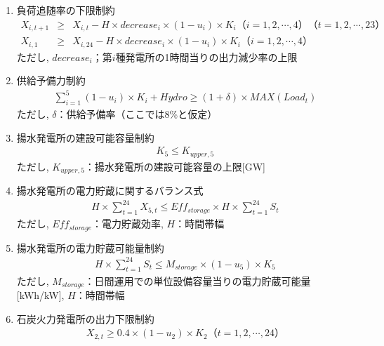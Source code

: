 \documentclass[]{jsarticle}
\begin{document}
\begin{enumerate}
            \item 負荷追随率の下限制約
              \begin{eqnarray}
                X_{i,t+1} &\ge& X_{i,t} - H \times decrease_i \times (1-u_i) \times K_i　（i = 1, 2, \cdots , 4）（t = 1, 2, \cdots , 23）\\
                X_{i,1} &\ge& X_{i,24} - H \times decrease_i \times (1-u_i) \times K_i　（i = 1, 2, \cdots , 4）
              \end{eqnarray}
              ただし, $decrease_i$；第$i$種発電所の1時間当りの出力減少率の上限\\

            \item 供給予備力制約
              \begin{eqnarray}
                \sum_{i=1}^5 (1-u_i) \times K_i + Hydro \ge (1 + \delta) \times MAX(Load_t)
              \end{eqnarray}
              ただし, $\delta$：供給予備率（ここでは8\%と仮定）\\

            \item 揚水発電所の建設可能容量制約
              \begin{eqnarray}
                K_5 \le K_{upper,5}
              \end{eqnarray}
              ただし, $K_{upper,5}$：揚水発電所の建設可能容量の上限[GW]\\

            \item 揚水発電所の電力貯蔵に関するバランス式
              \begin{eqnarray}
                H \times \sum_{t = 1}^{24} X_{5,t} \le Eff_{storage} \times H \times \sum_{t = 1}^{24} S_t
              \end{eqnarray}
              ただし, $Eff_{storage}$：電力貯蔵効率, $H$：時間帯幅\\

            \item 揚水発電所の電力貯蔵可能量制約
              \begin{eqnarray}
                H \times \sum_{t = 1}^{24} S_t \le M_{storage} \times (1 - u_5) \times K_5
              \end{eqnarray}
              ただし, $M_{storage}$：日間運用での単位設備容量当りの電力貯蔵可能量[kWh/kW], $H$：時間帯幅

            \item 石炭火力発電所の出力下限制約
              \begin{eqnarray}
                X_{2,t} \ge 0.4 \times (1-u_2) \times K_2　（t = 1, 2, \cdots , 24）
              \end{eqnarray}


\end{enumerate}
\end{document}

